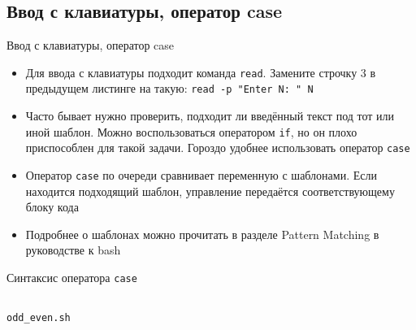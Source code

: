 \documentclass{beamer}
\begin{document}
\subsection{Ввод с клавиатуры, оператор case}
\begin{frame}{Ввод с клавиатуры, оператор case}
	\begin{itemize}
		\item{Для ввода с клавиатуры подходит команда \texttt{read}. Замените строчку 3 в предыдущем листинге на такую: \texttt{read~-p~"Enter~N: "{} N}}\pause
		\item{Часто бывает нужно проверить, подходит ли введённый текст под тот или иной шаблон. Можно воспользоваться оператором \texttt{if}, но он плохо приспособлен для такой задачи. Гороздо удобнее использовать оператор \texttt{case}}\pause
		\item{Оператор \texttt{case} по очереди сравнивает переменную с шаблонами. Если находится подходящий шаблон, управление передаётся соответствующему блоку кода}\pause
		\item{Подробнее о шаблонах можно прочитать в разделе Pattern Matching в руководстве к bash}
	\end{itemize}
\end{frame}

\begin{frame}
	\begin{minipage}{0,325\textwidth}
		Синтаксис оператора \texttt{case}
		\inputminted[linenos,fontsize=\tiny,bgcolor=listing]{bash}{files/unix_quickstart/case.sh}
	\end{minipage}
	\begin{minipage}{0,125\textwidth}
	\end{minipage}
	\begin{minipage}{0,525\textwidth}
		\texttt{odd\_even.sh}
		\inputminted[linenos,fontsize=\tiny,bgcolor=listing]{bash}{files/unix_quickstart/odd_even.sh}
	\end{minipage}
\end{frame}
\end{document}
